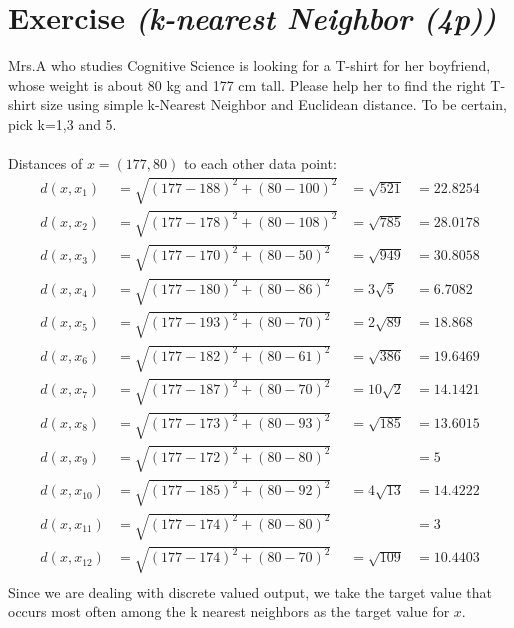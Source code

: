 \documentclass{article}
\author{Sandra Kohl, Jan Hendrik Kirchner, Max Bernhard Ilsen}
\begin{document}
\section{Exercise \textit{(k-nearest Neighbor (4p))}}
Mrs.A who studies Cognitive Science is looking for a T-shirt for her
boyfriend, whose weight is about 80 kg and 177 cm tall. Please help her
to find the right T-shirt size using simple k-Nearest Neighbor and
Euclidean distance. To be certain, pick k=1,3 and 5.\\
\\
Distances of $x=(177,80)$ to each other data point:
\begin{align*}
    d(x,x_1) &= \sqrt{(177-188)^2+(80-100)^2} &= \sqrt{521} &= 22.8254\\
    d(x,x_2) &= \sqrt{(177-178)^2+(80-108)^2} &= \sqrt{785} &= 28.0178\\
    d(x,x_3) &= \sqrt{(177-170)^2+(80-50)^2} &= \sqrt{949} &= 30.8058\\
    d(x,x_4) &= \sqrt{(177-180)^2+(80-86)^2} &= 3\sqrt{5} &= 6.7082\\
    d(x,x_5) &= \sqrt{(177-193)^2+(80-70)^2} &= 2\sqrt{89} &= 18.868\\
    d(x,x_6) &= \sqrt{(177-182)^2+(80-61)^2} &= \sqrt{386} &= 19.6469\\
    d(x,x_7) &= \sqrt{(177-187)^2+(80-70)^2} &= 10\sqrt{2} &= 14.1421\\
    d(x,x_8) &= \sqrt{(177-173)^2+(80-93)^2} &= \sqrt{185} &= 13.6015\\
    d(x,x_9) &= \sqrt{(177-172)^2+(80-80)^2} &&= 5\\
    d(x,x_{10}) &= \sqrt{(177-185)^2+(80-92)^2} &= 4\sqrt{13} &= 14.4222\\
    d(x,x_{11}) &= \sqrt{(177-174)^2+(80-80)^2} &&= 3\\
    d(x,x_{12}) &= \sqrt{(177-174)^2+(80-70)^2} &= \sqrt{109} &= 10.4403\\
\end{align*}
Since we are dealing with discrete valued output, we take the target value that
occurs most often among the k nearest neighbors as the target value for $x$.\\
\end{document}
